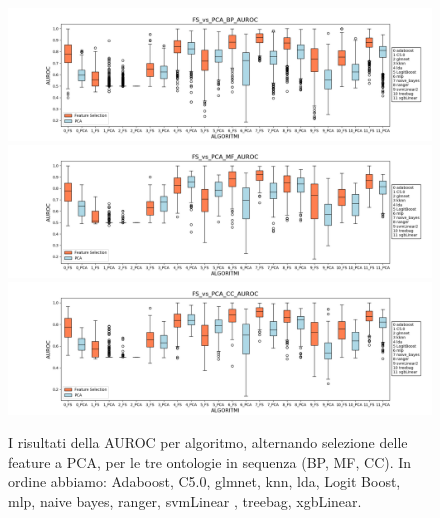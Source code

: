 \documentclass[12pt]{report}
\begin{document}
\begin{figure}[h!]
\centering
\hspace*{-0.9in}
\includegraphics[scale=0.43]{./images/FS_vs_PCA_BP_AUROC.png}
\hspace*{-0.9in}
\includegraphics[scale=0.43]{./images/FS_vs_PCA_MF_AUROC.png}
\hspace*{-0.9in}
\includegraphics[scale=0.43]{./images/FS_vs_PCA_CC_AUROC.png}
\caption{\footnotesize{I risultati della AUROC per algoritmo, alternando selezione delle feature a PCA, per le tre ontologie in sequenza (BP, MF, CC). In ordine abbiamo: Adaboost, C5.0, glmnet, knn, lda, Logit Boost, mlp, naive bayes, ranger, svmLinear , treebag, xgbLinear.}}
\label{versusAUROC}
\end{figure}
\end{document}
